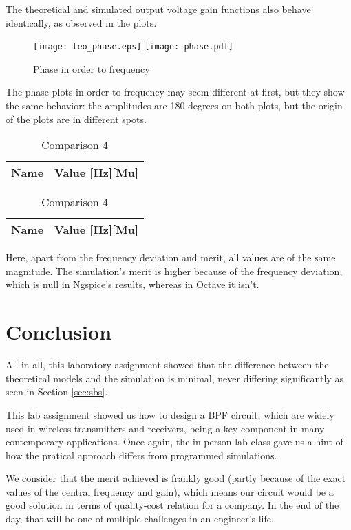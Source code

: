 The theoretical and simulated output voltage gain functions also behave identically, as observed in the plots.

\begin{figure}[h] \centering
\texttt{[image: teo\_phase.eps]}
\texttt{[image: phase.pdf]}
\caption{Phase in order to frequency}
\label{fig:comparison 4}
\end{figure}
\FloatBarrier

The phase plots in order to frequency may seem different at first, but they show the same behavior: the amplitudes are 180 degrees on both plots, but the origin of the plots are in different spots.

\begin{table}[h]
\begin{center}
  \begin{tabular}{|c|c|}
    \hline    
    {\bf Name} & {\bf Value [Hz][Mu]} \\ \hline
    
    \hline
  \end{tabular}
  \begin{tabular}{|c||c|}
    \hline    
    {\bf Name} & {\bf Value [Hz][Mu]} \\ \hline
    
    \hline
  \end{tabular}
  \caption{Comparison 4}
  \label{tab:comparison 4}
\end{center}
\end{table}
\FloatBarrier

Here, apart from the frequency deviation and merit, all values are of the same magnitude. The simulation's merit is higher because of the frequency deviation, which is null in Ngspice's results, whereas in Octave it isn't.

\section{Conclusion}
\label{sec:conclusion}

All in all, this laboratory assignment showed that the difference between the theoretical models and the simulation is minimal, never differing significantly as seen in Section \ref{sec:sbs}. \par

This lab assignment showed us how to design a BPF circuit, which are widely used in wireless transmitters and receivers, being a key component in many contemporary applications. Once again, the in-person lab class gave us a hint of how the pratical approach differs from programmed simulations. \par

We consider that the merit achieved is frankly good (partly because of the exact values of the central frequency and gain), which means our circuit would be a good solution in terms of quality-cost relation for a company. In the end of the day, that will be one of multiple challenges in an engineer's life.



